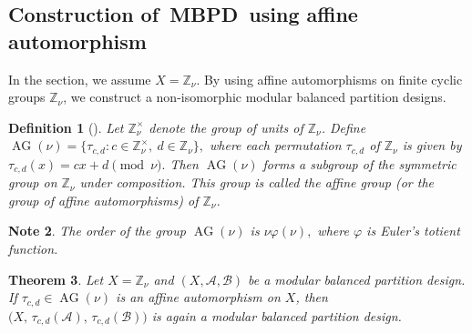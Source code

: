 \documentclass[preprint,11pt]{elsarticle}
\newcommand{\MBPD}{\textnormal{MBPD}}
\newcommand{\AG}{\operatorname{AG}}
\newtheorem{theorem}{Theorem}[section]
\newtheorem{definition}[theorem]{Definition}
\newtheorem{note}[theorem]{Note}
\begin{document}
\subsection{Construction of~\MBPD~using affine automorphism}

In the section, we assume $X=\mathbb{Z}_{\nu}$. By using affine automorphisms on finite cyclic groups $\mathbb{Z}_{\nu}$, we construct a non-isomorphic  modular balanced partition designs. 


\begin{definition}[\cite{cameron1999permutation}]Let $\mathbb{Z}_{\nu}^{\times}$ denote the group of units of $\mathbb{Z}_{\nu}$. Define
\(
\operatorname{AG}(\nu)=\{\tau_{c,d}: c\in \mathbb{Z}_{\nu}^{\times},\ d\in \mathbb{Z}_{\nu}\},
\)
where each permutation $\tau_{c,d}$ of $\mathbb{Z}_{\nu}$ is given by
\(
\tau_{c,d}(x)=cx+d \pmod{\nu}.
\)
Then $\AG(\nu)$ forms a subgroup of the symmetric group on $\mathbb{Z}_{\nu}$ under composition. This group is called the \emph{affine group} (or the group of \emph{affine automorphisms}) of $\mathbb{Z}_{\nu}$.
\end{definition}
\begin{note}
     The order of the group $\AG(\nu)$ is $\nu\varphi(\nu),$ where $\varphi$ is Euler’s totient function.
\end{note} 


   \begin{theorem}{\label{thm5.10}}
    Let $X = \mathbb{Z}_\nu$ and $(X, \mathcal{A}, \mathcal{B})$ be a modular balanced partition design. 
    If $\tau_{c,d} \in \AG(\nu)$ is an affine automorphism on $X$, then 
   $
    \big(X, \, \tau_{c,d}(\mathcal{A}), \, \tau_{c,d}(\mathcal{B}) \big)
    $
    is again a modular balanced partition design.
\end{theorem}
\end{document}
